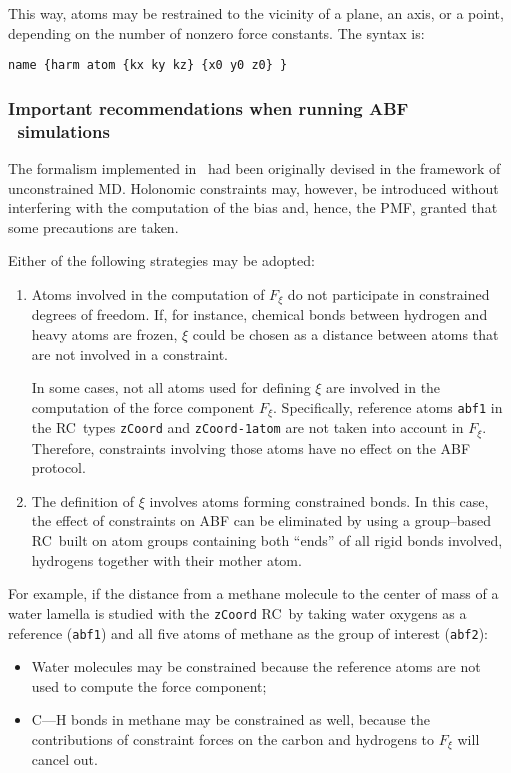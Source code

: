 This way, atoms may be restrained to the vicinity of a plane, an axis, or
a point, depending on the number of nonzero force constants. The syntax is:
\begin{verbatim}
name {harm atom {kx ky kz} {x0 y0 z0} }
\end{verbatim}



\subsubsection{Important recommendations when running ABF \ simulations}


The formalism implemented in \namd \ had been originally devised in the
framework of unconstrained MD. Holonomic constraints may, however,
be introduced without interfering with the computation of the bias and, hence,
the PMF, granted that some precautions are taken.


Either of the following strategies may be adopted:
\begin{enumerate}
\renewcommand{\labelenumi}{(\arabic{enumi})}
\item Atoms involved in the computation of $F_\xi$ do not participate in
constrained degrees of freedom.
If, for instance, chemical bonds between hydrogen and heavy
atoms are frozen, $\xi$ could
be chosen as a distance between atoms that are not involved
in a constraint.


In some cases, not all atoms used for defining $\xi$ are involved in
the computation of the force component $F_\xi$. Specifically, reference
atoms \texttt{abf1} in the RC\ types \texttt{zCoord} and \texttt{zCoord-1atom}
are not taken into account in $F_\xi$. Therefore, constraints involving
those atoms have no effect on the ABF protocol.


\item The definition of $\xi$ involves atoms forming constrained bonds.
In this case, the effect of constraints on ABF can be eliminated
by using a group--based RC\ built on atom groups
containing both ``ends'' of all rigid bonds involved, \ie hydrogens
together with their mother atom.
\end{enumerate}


For example, if the distance from a methane molecule to the center
of mass of a water lamella is studied with the \texttt{zCoord}
RC\ by taking water oxygens as a reference (\texttt{abf1}) and
all five atoms of methane as the group of interest (\texttt{abf2}):
\begin{itemize}
\item Water molecules may be constrained because the reference
atoms are not used to compute the force component;
\item C---H bonds in methane may be constrained as well, because
the contributions of constraint forces on the carbon and hydrogens
to $F_\xi$ will cancel out.
\end{itemize}



